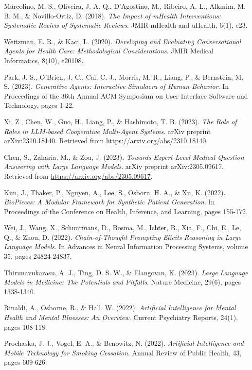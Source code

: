 \begin{thebibliography}{99}
 Marcolino, M. S., Oliveira, J. A. Q., D'Agostino, M., Ribeiro, A. L., Alkmim, M. B. M., \& Novillo-Ortiz, D. (2018). \textit{The Impact of mHealth Interventions: Systematic Review of Systematic Reviews}. JMIR mHealth and uHealth, 6(1), e23.

 Weitzman, E. R., \& Kaci, L. (2020). \textit{Developing and Evaluating Conversational Agents for Health Care: Methodological Considerations}. JMIR Medical Informatics, 8(10), e20108.

 Park, J. S., O'Brien, J. C., Cai, C. J., Morris, M. R., Liang, P., \& Bernstein, M. S. (2023). \textit{Generative Agents: Interactive Simulacra of Human Behavior}. In Proceedings of the 36th Annual ACM Symposium on User Interface Software and Technology, pages 1-22.

 Xi, Z., Chen, W., Guo, H., Liang, P., \& Hashimoto, T. B. (2023). \textit{The Role of Roles in LLM-based Cooperative Multi-Agent Systems}. arXiv preprint arXiv:2310.18140. Retrieved from \url{https://arxiv.org/abs/2310.18140}.

 Chen, S., Zaharia, M., \& Zou, J. (2023). \textit{Towards Expert-Level Medical Question Answering with Large Language Models}. arXiv preprint arXiv:2305.09617. Retrieved from \url{https://arxiv.org/abs/2305.09617}.

 Kim, J., Thaker, P., Nguyen, A., Lee, S., Osborn, H. A., \& Xu, K. (2022). \textit{BioPieces: A Modular Framework for Synthetic Patient Generation}. In Proceedings of the Conference on Health, Inference, and Learning, pages 155-172.

 Wei, J., Wang, X., Schuurmans, D., Bosma, M., Ichter, B., Xia, F., Chi, E., Le, Q., \& Zhou, D. (2022). \textit{Chain-of-Thought Prompting Elicits Reasoning in Large Language Models}. In Advances in Neural Information Processing Systems, volume 35, pages 24824-24837.

 Thirunavukarasu, A. J., Ting, D. S. W., \& Elangovan, K. (2023). \textit{Large Language Models in Medicine: The Potentials and Pitfalls}. Nature Medicine, 29(6), pages 1338-1340.

 Rinaldi, A., Osborne, R., \& Hall, W. (2022). \textit{Artificial Intelligence for Mental Health and Mental Illnesses: An Overview}. Current Psychiatry Reports, 24(1), pages 108-118.

 Prochaska, J. J., Vogel, E. A., \& Benowitz, N. (2022). \textit{Artificial Intelligence and Mobile Technology for Smoking Cessation}. Annual Review of Public Health, 43, pages 609-626.

\end{thebibliography}